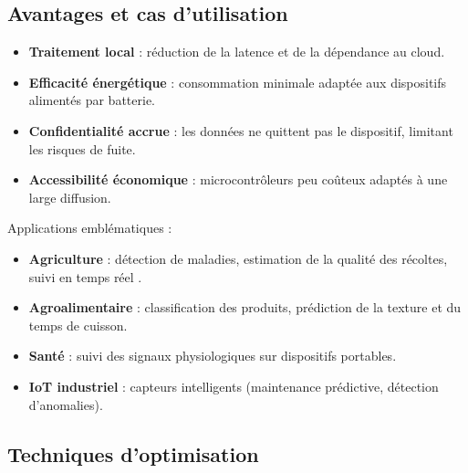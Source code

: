 \subsection{Avantages et cas d’utilisation}
\begin{itemize}
    \item \textbf{Traitement local} : réduction de la latence et de la dépendance au cloud.
    \item \textbf{Efficacité énergétique} : consommation minimale adaptée aux dispositifs alimentés par batterie.
    \item \textbf{Confidentialité accrue} : les données ne quittent pas le dispositif, limitant les risques de fuite.
    \item \textbf{Accessibilité économique} : microcontrôleurs peu coûteux adaptés à une large diffusion.
\end{itemize}
Applications emblématiques :
\begin{itemize}
    \item \textbf{Agriculture} : détection de maladies, estimation de la qualité des récoltes, suivi en temps réel \cite{moeketsi2025, kimutaiforster2024}.
    \item \textbf{Agroalimentaire} : classification des produits, prédiction de la texture et du temps de cuisson.
    \item \textbf{Santé} : suivi des signaux physiologiques sur dispositifs portables.
    \item \textbf{IoT industriel} : capteurs intelligents (maintenance prédictive, détection d’anomalies).
\end{itemize}

\subsection{Techniques d’optimisation}
